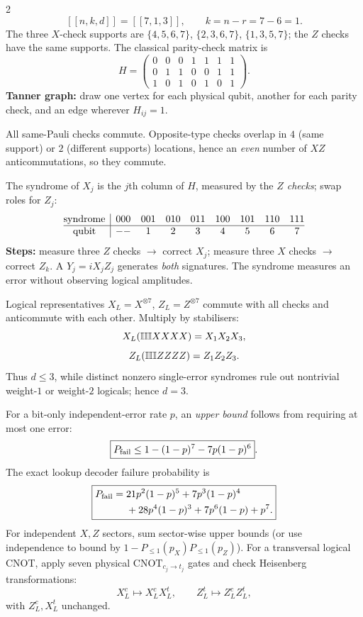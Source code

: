 \begin{multicols}{2}
\columnbreak
{}
\[\boxed{[[n,k,d]]=[[7,1,3]],\qquad k=n-r=7-6=1.}\]
The three $X$-check supports are $\{4,5,6,7\}$, $\{2,3,6,7\}$, $\{1,3,5,7\}$; the $Z$ checks have the same supports. The classical parity-check matrix is
\[H=\begin{pmatrix}0&0&0&1&1&1&1\\0&1&1&0&0&1&1\\1&0&1&0&1&0&1\end{pmatrix}.\]
\textbf{Tanner graph:} draw one vertex for each physical qubit, another for each parity check, and an edge wherever $H_{ij}=1$.

All same-Pauli checks commute. Opposite-type checks overlap in $4$ (same support) or $2$ (different supports) locations, hence an \emph{even} number of $XZ$ anticommutations, so they commute.

The syndrome of $X_j$ is the $j$th column of $H$, measured by the \emph{$Z$ checks}; swap roles for $Z_j$:
\[\begin{array}{@{}c|cccccccc@{}}\text{syndrome}&000&001&010&011&100&101&110&111\\\hline
\text{qubit}&--&1&2&3&4&5&6&7\end{array}\]
\textbf{Steps:} measure three $Z$ checks $\to$ correct $X_j$; measure three $X$ checks $\to$ correct $Z_k$. A $Y_j=iX_jZ_j$ generates \emph{both} signatures. The syndrome measures an error without observing logical amplitudes.

Logical representatives $X_L=X^{\otimes7}$, $Z_L=Z^{\otimes7}$ commute with all checks and anticommute with each other. Multiply by stabilisers:
\[X_L(\mathbb I\mathbb I\mathbb I X X X X)=X_1X_2X_3,\]
\[Z_L(\mathbb I\mathbb I\mathbb I Z Z Z Z)=Z_1Z_2Z_3.\]
Thus $d\le3$, while distinct nonzero single-error syndromes rule out nontrivial weight-$1$ or weight-$2$ logicals; hence $d=3$.

For a bit-only independent-error rate $p$, an \emph{upper bound} follows from requiring at most one error:
\[\boxed{P_{\rm fail}\le1-(1-p)^7-7p(1-p)^6}.\]
The exact lookup decoder failure probability is
\[\boxed{\begin{aligned}P_{\rm fail}={}&21p^2(1-p)^5+7p^3(1-p)^4\\&+28p^4(1-p)^3+7p^6(1-p)+p^7.\end{aligned}}\]
For independent $X,Z$ sectors, sum sector-wise upper bounds (or use independence to bound by $1-P_{\le1}(p_X)P_{\le1}(p_Z)$). For a transversal logical CNOT, apply seven physical $\mathrm{CNOT}_{c_j\to t_j}$ gates and check Heisenberg transformations:
\[\boxed{X_L^c\mapsto X_L^cX_L^t,\qquad Z_L^t\mapsto Z_L^cZ_L^t},\]
with $Z_L^c,X_L^t$ unchanged.
\end{multicols}